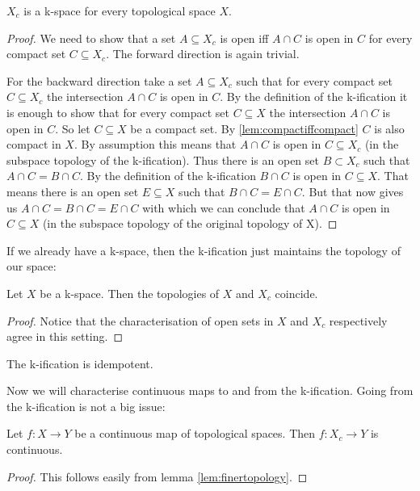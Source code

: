 \begin{lem}
    $X_c$ is a k-space for every topological space $X$.
\end{lem}
\begin{proof}
    We need to show that a set $A \subseteq X_c$ is open iff $A \cap C$ is open in $C$ for every compact set $C \subseteq X_c$. The forward direction is again trivial. 
    
    For the backward direction take a set $A \subseteq X_c$ such that for every compact set $C \subseteq X_c$ the intersection $A \cap C$ is open in $C$. 
    By the definition of the k-ification it is enough to show that for every compact set $C \subseteq X$ the intersection $A \cap C$ is open in $C$. So let $C \subseteq X$ be a compact set. 
    By \ref{lem:compactiffcompact} $C$ is also compact in $X$.
    By assumption this means that $A \cap C$ is open in $C \subseteq X_c$ (in the subspace topology of the k-ification). Thus there is an open set $B \subset X_c$ such that $A \cap C = B \cap C$. 
    By the definition of the k-ification $B \cap C$ is open in $C \subseteq X$. 
    That means there is an open set $E \subseteq X$ such that $B \cap C = E \cap C$. 
    But that now gives us $A \cap C = B \cap C = E \cap C$ with which we can conclude that $A \cap C$ is open in $C \subseteq X$ (in the subspace topology of the original topology of X).
\end{proof}

If we already have a k-space, then the k-ification just maintains the topology of our space:

\begin{lem}\label{lem:kificationkspace}
    Let $X$ be a k-space.
    Then the topologies of $X$ and $X_c$ coincide.
\end{lem}
\begin{proof}
    Notice that the characterisation of open sets in $X$ and $X_c$ respectively agree in this setting.
\end{proof}

\begin{cor}
    The k-ification is idempotent.
\end{cor}

Now we will characterise continuous maps to and from the k-ification. 
Going from the k-ification is not a big issue: 

\begin{lem}
    Let $f \colon X \to Y$ be a continuous map of topological spaces.
    Then $f \colon X_c \to Y$ is continuous.
\end{lem}
\begin{proof}
    This follows easily from lemma \ref{lem:finertopology}.
\end{proof}

